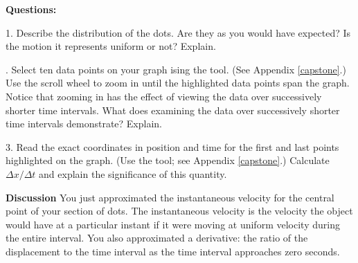 \medskip

{\noindent \bf Questions:}

1. Describe the distribution of the dots. Are they as you would have expected?
Is the motion it represents uniform or not? Explain. 
\answerspace{20mm}

. Select ten data points on your graph ising the  tool. (See Appendix \ref{capstone}.) 
Use the scroll wheel to zoom in until the highlighted data points span the graph.
Notice that zooming in has the effect of viewing the data over successively
shorter time intervals. What does examining the data over successively shorter
time intervals demonstrate? Explain.
\answerspace{20mm}

3. Read the exact coordinates in position and time
for the first and last points highlighted on the graph. (Use the  tool; see Appendix \ref{capstone}.)  Calculate \( \Delta x/\Delta t \)
and explain the significance of this quantity.
\answerspace{20mm}

{\noindent \bf Discussion} You just approximated the instantaneous velocity for the central point of your section of dots. The instantaneous velocity is the velocity the object would have at a particular instant if it were moving at uniform velocity during the entire interval. You also approximated a derivative: the ratio of the displacement to the time interval as the time interval approaches zero seconds. 

